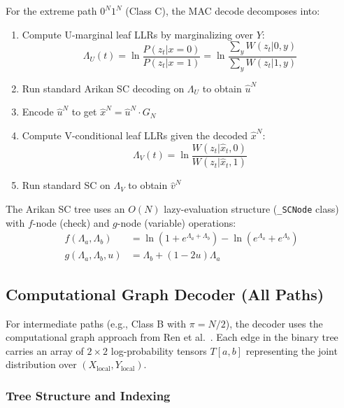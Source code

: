 \documentclass[11pt,a4paper]{article}
\begin{document}
For the extreme path $0^N 1^N$ (Class C), the MAC decode decomposes into:
\begin{enumerate}
  \item Compute U-marginal leaf LLRs by marginalizing over $Y$:
  \begin{equation}
    \Lambda_U(t) = \ln \frac{P(z_t | x{=}0)}{P(z_t | x{=}1)} = \ln \frac{\sum_y W(z_t|0,y)}{\sum_y W(z_t|1,y)}
  \end{equation}
  \item Run standard Arikan SC decoding on $\Lambda_U$ to obtain $\hat{u}^N$
  \item Encode $\hat{u}^N$ to get $\hat{x}^N = \hat{u}^N \cdot G_N$
  \item Compute V-conditional leaf LLRs given the decoded $\hat{x}^N$:
  \begin{equation}
    \Lambda_V(t) = \ln \frac{W(z_t | \hat{x}_t, 0)}{W(z_t | \hat{x}_t, 1)}
  \end{equation}
  \item Run standard SC on $\Lambda_V$ to obtain $\hat{v}^N$
\end{enumerate}

The Arikan SC tree uses an $O(N)$ lazy-evaluation structure (\texttt{\_SCNode}
class) with $f$-node (check) and $g$-node (variable) operations:
\begin{align}
  f(\Lambda_a, \Lambda_b) &= \ln(1 + e^{\Lambda_a + \Lambda_b}) - \ln(e^{\Lambda_a} + e^{\Lambda_b}) \label{eq:fnode} \\
  g(\Lambda_a, \Lambda_b, u) &= \Lambda_b + (1 - 2u) \Lambda_a \label{eq:gnode}
\end{align}

\subsection{Computational Graph Decoder (All Paths)}
\label{sec:comp-graph}

For intermediate paths (e.g., Class B with $\pi = N/2$), the decoder uses
the computational graph approach from Ren et al.~\cite{ren2025}. Each edge
in the binary tree carries an array of $2 \times 2$ log-probability tensors
$T[a, b]$ representing the joint distribution over $(X_{\text{local}}, Y_{\text{local}})$.

\subsubsection{Tree Structure and Indexing}
\end{document}
